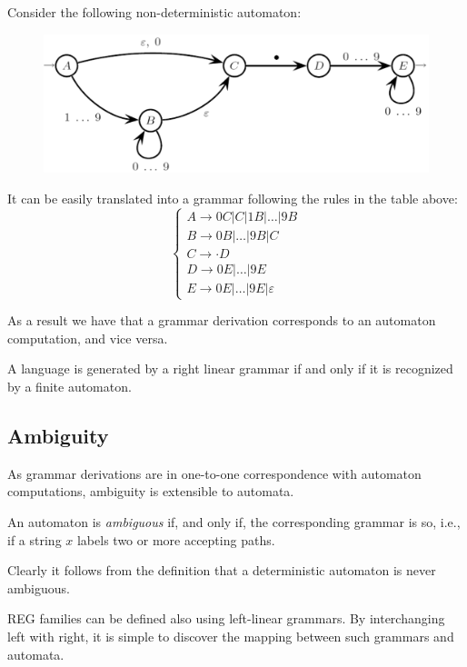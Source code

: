 \begin{example}
    Consider the following non-deterministic automaton: 
    \begin{figure}[H]
        \centering
        \includegraphics[width=0.5\linewidth]{images/nfsa.png}
    \end{figure}
    It can be easily translated into a grammar following the rules in the table above: 
    \[
    \begin{cases}
        A \rightarrow 0C|C|1B|\dots|9B \\
        B \rightarrow 0B|\dots|9B|C \\
        C \rightarrow \cdot D \\
        D \rightarrow 0E|\dots|9E \\
        E \rightarrow 0E|\dots|9E|\varepsilon

    \end{cases}    
    \]
\end{example}
As a result we have that a grammar derivation corresponds to an automaton computation, and vice versa. 
\begin{proposition}
    A language is generated by a right linear grammar if and only if it is recognized by a finite automaton.
\end{proposition}

\subsection*{Ambiguity}
As grammar derivations are in one-to-one correspondence with automaton computations, ambiguity is extensible to automata.
\begin{definition}
    An automaton is \emph{ambiguous} if, and only if, the corresponding grammar is so, i.e., if a string $x$ labels two or more accepting paths.
\end{definition}
Clearly it follows from the definition that a deterministic automaton is never ambiguous.

REG families can be defined also using left-linear grammars. 
By interchanging left with right, it is simple to discover the mapping between such grammars and automata.